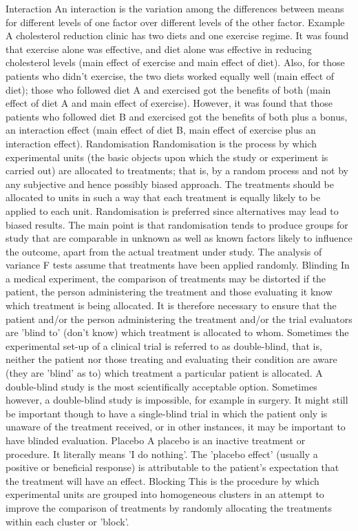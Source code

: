 Interaction 
An interaction is the variation among the differences between means for different levels of one factor over different levels of the other factor.
Example 
A cholesterol reduction clinic has two diets and one exercise regime. It was found that exercise alone was effective, and diet alone was effective in reducing cholesterol levels (main effect of exercise and main effect of diet). Also, for those patients who didn't exercise, the two diets worked equally well (main effect of diet); those who followed diet A and exercised got the benefits of both (main effect of diet A and main effect of exercise). However, it was found that those patients who followed diet B and exercised got the benefits of both plus a bonus, an interaction effect (main effect of diet B, main effect of exercise plus an interaction effect).
Randomisation 
Randomisation is the process by which experimental units (the basic objects upon which the study or experiment is carried out) are allocated to treatments; that is, by a random process and not by any subjective and hence possibly biased approach. The treatments should be allocated to units in such a way that each treatment is equally likely to be applied to each unit.
Randomisation is preferred since alternatives may lead to biased results.
The main point is that randomisation tends to produce groups for study that are comparable in unknown as well as known factors likely to influence the outcome, apart from the actual treatment under study. The analysis of variance F tests assume that treatments have been applied randomly.
Blinding 
In a medical experiment, the comparison of treatments may be distorted if the patient, the person administering the treatment and those evaluating it know which treatment is being allocated. It is therefore necessary to ensure that the patient and/or the person administering the treatment and/or the trial evaluators are 'blind to' (don't know) which treatment is allocated to whom.
Sometimes the experimental set-up of a clinical trial is referred to as double-blind, that is, neither the patient nor those treating and evaluating their condition are aware (they are 'blind' as to) which treatment a particular patient is allocated. A double-blind study is the most scientifically acceptable option.
Sometimes however, a double-blind study is impossible, for example in surgery. It might still be important though to have a single-blind trial in which the patient only is unaware of the treatment received, or in other instances, it may be important to have blinded evaluation.
Placebo 
A placebo is an inactive treatment or procedure. It literally means 'I do nothing'. The 'placebo effect' (usually a positive or beneficial response) is attributable to the patient's expectation that the treatment will have an effect.
Blocking 
This is the procedure by which experimental units are grouped into homogeneous clusters in an attempt to improve the comparison of treatments by randomly allocating the treatments within each cluster or 'block'.

